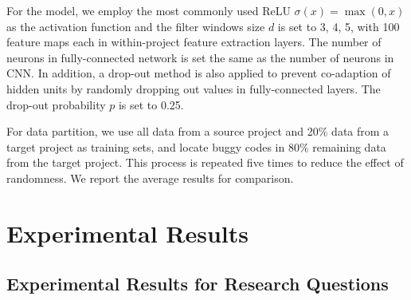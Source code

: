 For the \TRANPCNN model, we employ the most commonly used ReLU $\sigma(x)=\max(0,x)$ as the activation function and the filter windows size $d$ is set to 3, 4, 5, with 100 feature maps each in within-project feature extraction layers. The number of neurons in fully-connected network is set the same as the number of neurons in CNN. In addition, a drop-out method is also applied to prevent co-adaption of hidden units by randomly dropping out values in fully-connected layers. The drop-out probability $p$ is set to 0.25.

For data partition, we use all data from a source project and 20\% data from a target project as training sets, and locate buggy codes in 80\% remaining data from the target project. This process is repeated five times to reduce the effect of randomness. We report the average results for comparison. 

\section{Experimental Results}

\subsection{Experimental Results for Research Questions}

